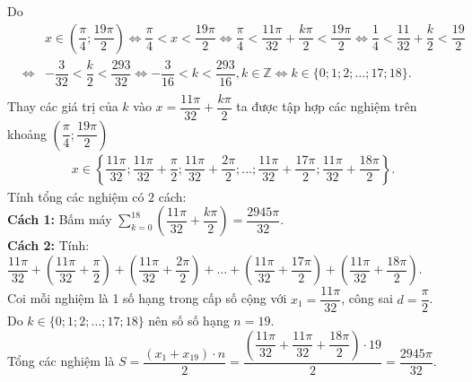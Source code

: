 \begin{ex}
{\begin{itemchoice}
	\itemch Do 
\allowdisplaybreaks
\begin{eqnarray*}	
&&x\in\left(\dfrac{\pi}{4};\dfrac{19\pi}{2}\right)\Leftrightarrow\dfrac{\pi}{4}<x<\dfrac{19\pi}{2}\Leftrightarrow\dfrac{\pi}{4}<\dfrac{11\pi}{32}+\dfrac{k\pi}{2}<\dfrac{19\pi}{2}\Leftrightarrow\dfrac{1}{4}<\dfrac{11}{32}+\dfrac{k}{2}<\dfrac{19}{2}\\
&\Leftrightarrow&-\dfrac{3}{32}<\dfrac{k}{2}<\dfrac{293}{32}\Leftrightarrow-\dfrac{3}{16}<k<\dfrac{293}{16},k\in\mathbb{Z}\Leftrightarrow k\in\{0;1;2;\dots;17;18\}.\\
\end{eqnarray*}
Thay các giá trị của $k$ vào $x=\dfrac{11\pi}{32}+\dfrac{k\pi}{2}$ ta được tập hợp các nghiệm trên khoảng $\left(\dfrac{\pi}{4};\dfrac{19\pi}{2}\right)$
\begin{align*}
x\in\left\{\dfrac{11\pi}{32};\dfrac{11\pi}{32}+\dfrac{\pi}{2};\dfrac{11\pi}{32}+\dfrac{2\pi}{2};\dots;\dfrac{11\pi}{32}+\dfrac{17\pi}{2};\dfrac{11\pi}{32}+\dfrac{18\pi}{2}\right\}.
\end{align*}
Tính tổng các nghiệm có $2$ cách:\\
\textbf{Cách 1:} Bấm máy $\sum\limits_{k=0}^{18}\left(\dfrac{11\pi}{32}+\dfrac{k\pi}{2}\right)=\dfrac{2945\pi}{32}$.\\
\textbf{Cách 2:} Tính: $\dfrac{11\pi}{32}+\left(\dfrac{11\pi}{32}+\dfrac{\pi}{2}\right)+\left(\dfrac{11\pi}{32}+\dfrac{2\pi}{2}\right)+\dots+\left(\dfrac{11\pi}{32}+\dfrac{17\pi}{2}\right)+\left(\dfrac{11\pi}{32}+\dfrac{18\pi}{2}\right)$.\\
Coi mỗi nghiệm là 1 số hạng trong cấp số cộng với $x_1=\dfrac{11\pi}{32}$, công sai $d=\dfrac{\pi}{2}$.\\
Do $k\in\{0;1;2;\dots;17;18\}$ nên số số hạng $n=19$.\\
Tổng các nghiệm là $S=\dfrac{(x_1+x_{19})\cdot n}{2}=\dfrac{\left(\dfrac{11\pi}{32}+\dfrac{11\pi}{32}+\dfrac{18\pi}{2}\right)\cdot19}{2}=\dfrac{2945\pi}{32}$.
	\end{itemchoice}
    }
\end{ex}


